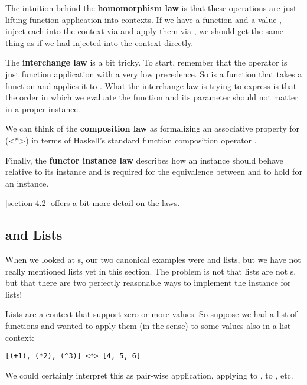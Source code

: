 The intuition behind the \textbf{homomorphism law} is that these operations are just lifting function application into
 contexts. If we have a function  and a value , inject each into the context
via  and apply them via \code{(<*>)}, we should get the same thing as if we had injected
 into the context directly.

The \textbf{interchange law} is a bit tricky. To start, remember that the \code{(\$)} operator is just function application
with a very low precedence. So  is a function that takes a function and applies it to .
What the interchange law is trying to express is that the order in which we evaluate the function and its 
parameter should not matter in a proper  instance.

We can think of the \textbf{composition law} as formalizing an associative property for \code(<*>) in terms 
of Haskell's standard function composition operator .

Finally, the \textbf{functor instance law} describes how an  instance should behave relative to
its  instance and is required for the equivalence between \code{(<\$>)} and  to hold for
an  instance.

\cite{typeclassopedia}[section 4.2] offers a bit more detail on the  laws.

\subsection{ and Lists}

When we looked at s, our two canonical examples were  and lists, but we have not really mentioned
lists yet in this section. The problem is not that lists are not s, but that there are two perfectly
reasonable ways to implement the  instance for lists!

Lists are a context that support zero or more values. So suppose we had a list of functions and wanted to apply them
(in the  sense) to some values also in a list context: 

\begin{lstlisting}
[(+1), (*2), (^3)] <*> [4, 5, 6]
\end{lstlisting}

We could certainly interpret this as pair-wise application, applying  to ,  to , etc.

